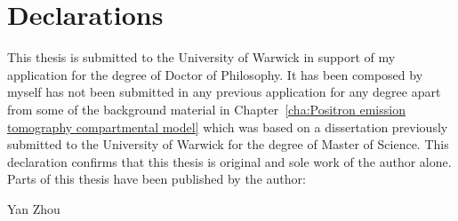\chapter*{Declarations}

This thesis is submitted to the University of Warwick in support of my
application for the degree of Doctor of Philosophy. It has been composed by
myself has not been submitted in any previous application for any degree
apart from some of the background material in Chapter~\ref{cha:Positron
emission tomography compartmental model} which was based on a dissertation
previously submitted to the University of Warwick for the degree of Master of
Science. This declaration confirms that this thesis is original and sole work
of the author alone. Parts of this thesis have been published by the author:





\baselineskip
\noindent Yan Zhou
